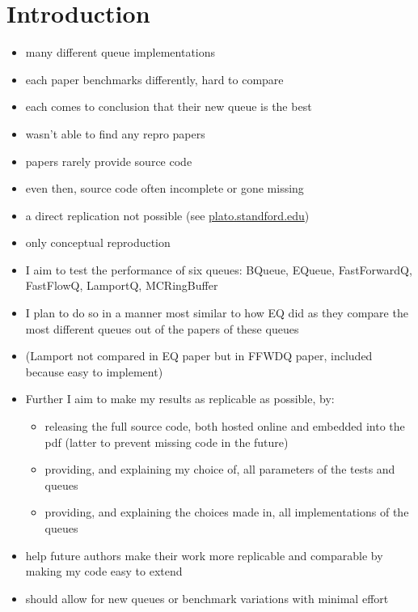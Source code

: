\section{Introduction}
\begin{itemize}
    \item many different queue implementations
    \item each paper benchmarks differently, hard to compare
    \item each comes to conclusion that their new queue is the best
    \item wasn't able to find any repro papers
    \item papers rarely provide source code
    \item even then, source code often incomplete or gone missing
    \item a direct replication not possible (see
            \href{https://plato.stanford.edu/entries/scientific-reproducibility/#:~:text=direct
                replication%
                conceptual%
                to%
        }{plato.standford.edu})
    \item only conceptual reproduction
    \item I aim to test the performance of six queues: BQueue, EQueue, FastForwardQ, FastFlowQ, LamportQ, MCRingBuffer
    \item I plan to do so in a manner most similar to how EQ did as they compare the most different
        queues out of the papers of these queues
    \item (Lamport not compared in EQ paper but in FFWDQ paper, included because easy to implement)
    \item Further I aim to make my results as replicable as possible, by:
        \begin{itemize}
            \item releasing the full source code, both hosted online and embedded into the pdf
                (latter to prevent missing code in the future)
            \item providing, and explaining my choice of, all parameters of the tests and queues
            \item providing, and explaining the choices made in, all implementations of the queues
        \end{itemize}
    \item help future authors make their work more replicable and comparable by making my code easy to extend
    \item should allow for new queues or benchmark variations with minimal effort
\end{itemize}
